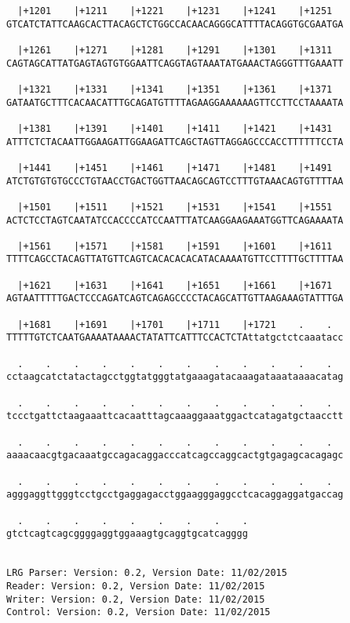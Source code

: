 \documentclass{article}
\begin{document}
\begin{Verbatim}
  |+1201    |+1211    |+1221    |+1231    |+1241    |+1251  
GTCATCTATTCAAGCACTTACAGCTCTGGCCACAACAGGGCATTTTACAGGTGCGAATGA
                                                            
  |+1261    |+1271    |+1281    |+1291    |+1301    |+1311  
CAGTAGCATTATGAGTAGTGTGGAATTCAGGTAGTAAATATGAAACTAGGGTTTGAAATT
                                                            
  |+1321    |+1331    |+1341    |+1351    |+1361    |+1371  
GATAATGCTTTCACAACATTTGCAGATGTTTTAGAAGGAAAAAAGTTCCTTCCTAAAATA
                                                            
  |+1381    |+1391    |+1401    |+1411    |+1421    |+1431  
ATTTCTCTACAATTGGAAGATTGGAAGATTCAGCTAGTTAGGAGCCCACCTTTTTTCCTA
                                                            
  |+1441    |+1451    |+1461    |+1471    |+1481    |+1491  
ATCTGTGTGTGCCCTGTAACCTGACTGGTTAACAGCAGTCCTTTGTAAACAGTGTTTTAA
                                                            
  |+1501    |+1511    |+1521    |+1531    |+1541    |+1551  
ACTCTCCTAGTCAATATCCACCCCATCCAATTTATCAAGGAAGAAATGGTTCAGAAAATA
                                                            
  |+1561    |+1571    |+1581    |+1591    |+1601    |+1611  
TTTTCAGCCTACAGTTATGTTCAGTCACACACACATACAAAATGTTCCTTTTGCTTTTAA
                                                            
  |+1621    |+1631    |+1641    |+1651    |+1661    |+1671  
AGTAATTTTTGACTCCCAGATCAGTCAGAGCCCCTACAGCATTGTTAAGAAAGTATTTGA
                                                            
  |+1681    |+1691    |+1701    |+1711    |+1721    .    .  
TTTTTGTCTCAATGAAAATAAAACTATATTCATTTCCACTCTAttatgctctcaaatacc
                                                            
  .    .    .    .    .    .    .    .    .    .    .    .  
cctaagcatctatactagcctggtatgggtatgaaagatacaaagataaataaaacatag
                                                            
  .    .    .    .    .    .    .    .    .    .    .    .  
tccctgattctaagaaattcacaatttagcaaaggaaatggactcatagatgctaacctt
                                                            
  .    .    .    .    .    .    .    .    .    .    .    .  
aaaacaacgtgacaaatgccagacaggacccatcagccaggcactgtgagagcacagagc
                                                            
  .    .    .    .    .    .    .    .    .    .    .    .  
agggaggttgggtcctgcctgaggagacctggaagggaggcctcacaggaggatgaccag
                                                            
  .    .    .    .    .    .    .    .    .
gtctcagtcagcggggaggtggaaagtgcaggtgcatcagggg
                                           
                                           
LRG Parser: Version: 0.2, Version Date: 11/02/2015
Reader: Version: 0.2, Version Date: 11/02/2015
Writer: Version: 0.2, Version Date: 11/02/2015
Control: Version: 0.2, Version Date: 11/02/2015
\end{Verbatim}
\end{document}
